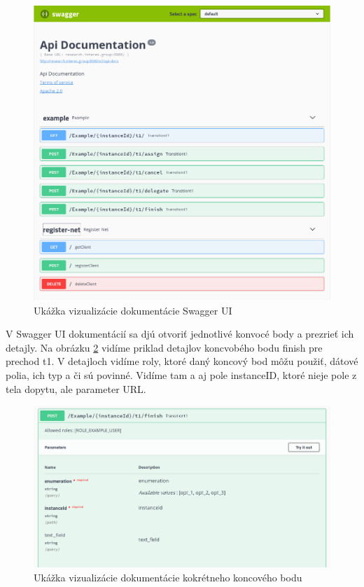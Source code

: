 \begin{figure}[!htbp] 
	\centering 
	\includegraphics[width=16cm]{img/swagger_ui.png} 
	\caption{Ukážka vizualizácie dokumentácie Swagger UI} 
	\label{swagger_ui} 
\end{figure}

V Swagger UI dokumentácií sa djú otvoriť jednotlivé konvocé body a prezrieť ich detajly. Na obrázku \ref{swagger_ui_endpoint} vidíme priklad detajlov koncvobého bodu finish pre prechod t1. V detajloch vidíme roly, ktoré daný koncový bod môžu použiť, dátové polia, ich typ a či sú povinné. Vidíme tam a aj pole instanceID, ktoré nieje pole z tela dopytu, ale parameter URL.
 

\begin{figure}[!htbp] 
	\centering 
	\includegraphics[width=16cm]{img/swagger_ui_endpoint.png} 
	\caption{Ukážka vizualizácie dokumentácie kokrétneho koncového bodu} 
	\label{swagger_ui_endpoint} 
\end{figure}



